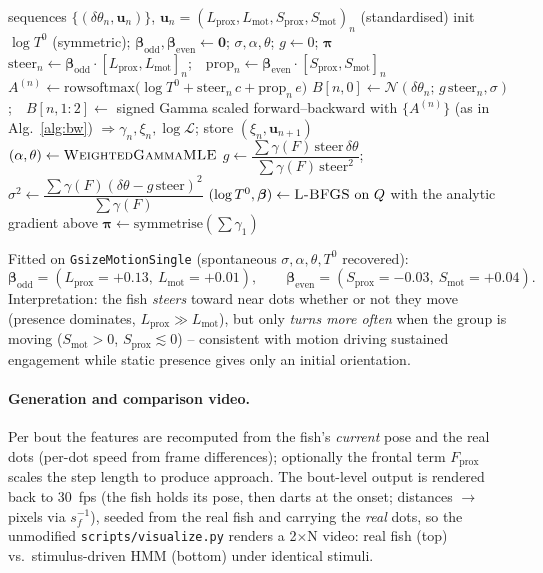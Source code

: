 \documentclass[11pt]{article}
\begin{document}
\begin{algorithm}[h]
\caption{Input-driven Baum-Welch (rich stimulus-driven HMM)}\label{alg:iohmm}
\begin{algorithmic}[1]
\Require sequences $\{(\delta\theta_n,\mathbf u_n)\}$, $\mathbf u_n=(L_{\text{prox}},L_{\text{mot}},S_{\text{prox}},S_{\text{mot}})_n$ (standardised)
\State init $\log T^0$ (symmetric); $\boldsymbol\beta_{\text{odd}},\boldsymbol\beta_{\text{even}}\gets\mathbf 0$; $\sigma,\alpha,\theta$; $g\gets 0$; $\boldsymbol\pi$
\Repeat
    \State $\text{steer}_n\gets\boldsymbol\beta_{\text{odd}}\!\cdot\![L_{\text{prox}},L_{\text{mot}}]_n$;\ \ $\text{prop}_n\gets\boldsymbol\beta_{\text{even}}\!\cdot\![S_{\text{prox}},S_{\text{mot}}]_n$
    \State $A^{(n)}\gets\mathrm{rowsoftmax}\big(\log T^0+\text{steer}_n\,c+\text{prop}_n\,e\big)$
    \State $B[n,0]\gets\mathcal N(\delta\theta_n;\,g\,\text{steer}_n,\sigma)$;\ \ $B[n,1{:}2]\gets$ signed Gamma
    \State scaled forward--backward with $\{A^{(n)}\}$ (as in Alg.~\ref{alg:bw}) $\Rightarrow\gamma_n,\xi_n,\log\mathcal L$; store $(\xi_n,\mathbf u_{n+1})$
  \EndFor
  \State $(\alpha,\theta)\gets\textsc{WeightedGammaMLE}$
  \State $g\gets\dfrac{\sum\gamma(F)\,\text{steer}\,\delta\theta}{\sum\gamma(F)\,\text{steer}^2}$;\ \ $\sigma^2\gets\dfrac{\sum\gamma(F)(\delta\theta-g\,\text{steer})^2}{\sum\gamma(F)}$
  \State $(\log T^0,\boldsymbol\beta)\gets\textsc{L-BFGS}\ \text{on}\ Q$ with the analytic gradient above
  \State $\boldsymbol\pi\gets\mathrm{symmetrise}(\textstyle\sum\gamma_1)$
\end{algorithmic}
\end{algorithm}

Fitted on \texttt{GsizeMotionSingle} (spontaneous $\sigma,\alpha,\theta,T^0$
recovered):
\[
\boldsymbol\beta_{\text{odd}}=(L_{\text{prox}}{=}{+}0.13,\ L_{\text{mot}}{=}{+}0.01),
\qquad
\boldsymbol\beta_{\text{even}}=(S_{\text{prox}}{=}{-}0.03,\ S_{\text{mot}}{=}{+}0.04).
\]
Interpretation: the fish \emph{steers} toward near dots whether or not they move
(presence dominates, $L_{\text{prox}}\gg L_{\text{mot}}$), but only \emph{turns
more often} when the group is moving ($S_{\text{mot}}>0$,
$S_{\text{prox}}\lesssim0$) -- consistent with motion driving sustained
engagement while static presence gives only an initial orientation.

\paragraph{Generation and comparison video.}
Per bout the features are recomputed from the fish's \emph{current} pose and the
real dots (per-dot speed from frame differences); optionally the frontal term
$F_{\text{prox}}$ scales the step length to produce approach. The bout-level
output is rendered back to 30~fps (the fish holds its pose, then darts at the
onset; distances $\to$ pixels via $s_f^{-1}$), seeded from the real fish and
carrying the \emph{real} dots, so the unmodified \texttt{scripts/visualize.py}
renders a 2$\times$N video: real fish (top) vs.\ stimulus-driven HMM (bottom)
under identical stimuli.
\end{document}
